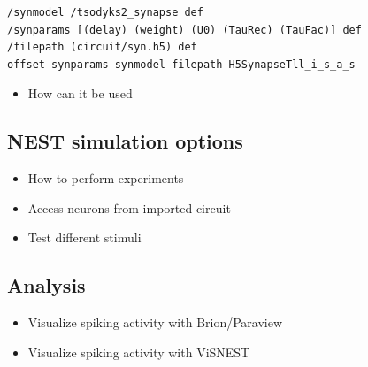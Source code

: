 \begin{lstlisting}[label=sliSynapses,caption=Example importing synapses]
/synmodel /tsodyks2_synapse def
/synparams [(delay) (weight) (U0) (TauRec) (TauFac)] def
/filepath (circuit/syn.h5) def
offset synparams synmodel filepath H5SynapseTll_i_s_a_s
\end{lstlisting}
\begin{itemize}
      \item How can it be used
\end{itemize}

\subsection{NEST simulation options}

\begin{itemize}
	  \item How to perform experiments
      \item Access neurons from imported circuit
      \item Test different stimuli 
\end{itemize}

\subsection{Analysis}
\begin{itemize}
	  \item Visualize spiking activity with Brion/Paraview
      \item Visualize spiking activity with ViSNEST
\end{itemize}